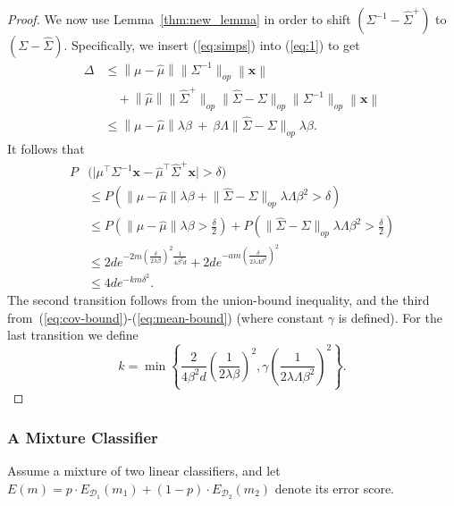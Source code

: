 \documentclass{article}
\newcommand{\bx}{\bm{x}}
\newcommand{\Dd}{\mathcal{D}}
\newcommand{\pR}{1}\newcommand{\rR}{2}\newcommand{\prR}{i}
\newcommand{\capB}{\beta}
\begin{document}
\begin{proof}
We now use Lemma~\ref{thm:new_lemma}  in order to shift $(\Sigma^{-1} - \hat\Sigma^{+})$ to $(\Sigma - \hat\Sigma)$. Specifically, we insert (\ref{eq:simps})  into (\ref{eq:1}) to get
\begin{align*}
\Delta
&\leq \left\| \mu-\hat\mu\right\| \big\|\Sigma^{-1}\big\|_{op} \left\|\bx \right\| \\
&\quad + \left\|\hat\mu\right\| \big\|  \hat\Sigma^{+} \big\|_{op} \big\|\hat\Sigma-\Sigma\big\|_{op}  \big\|\Sigma^{-1}\big\|_{op} \left\|\bx\right\|\\
&\leq \left\| \mu-\hat\mu\right\| \lambda \capB ~+~ \capB \Lambda \big\|\hat\Sigma-\Sigma\big\|_{op} \lambda \capB.
\end{align*}
It follows that
\begin{equation*}
\begin{split}
P&\Big (\big |\mu^\top\Sigma^{-1}\bx - \hat\mu^\top \hat\Sigma^{+}\bx\big | > \delta\Big ) \\
&\leq P(\left\| \mu-\hat\mu\right\| \lambda \capB +  \big\|\hat\Sigma-\Sigma\big\|_{op} \lambda\Lambda \capB^2 > \delta) \\ 
&\leq P(\left\| \mu-\hat\mu\right\| \lambda \capB > \frac{\delta}{2}) + P( \big\|\hat\Sigma-\Sigma\big\|_{op} \lambda\Lambda \capB^2 > \frac{\delta}{2}) \\ 
&\leq 2d e^{-2 m \left (\frac{\delta}{2\lambda \capB}\right )^2 \frac{1}{4\capB^2 d}} + 2d e^{-a m \left (\frac{\delta}{2\lambda\Lambda \capB^2}\right )^2} \\
&\leq 4d e^{-k m \delta^2}.
\end{split}
\end{equation*}
The second transition follows from the union-bound inequality, and the third from~(\ref{eq:cov-bound})-(\ref{eq:mean-bound}) (where constant $\gamma$ is defined). For the last transition we define
\begin{equation*}
k=\min\left\{\frac{2}{4\capB^2 d}\left(\frac{1}{2\lambda \capB}\right )^2,\gamma \left(\frac{1}{2\lambda\Lambda \capB^2}\right)^2\right\}.
\end{equation*}
\end{proof}

\subsubsection{A Mixture Classifier}
\label{app:proof_of_thm_5}

Assume a mixture of two linear classifiers, and let $E(m)=p\cdot E_{\Dd_\pR}(m_\pR) + (1-p)\cdot E_{\Dd_\rR}(m_\rR)$ denote its error score. 
\end{document}
